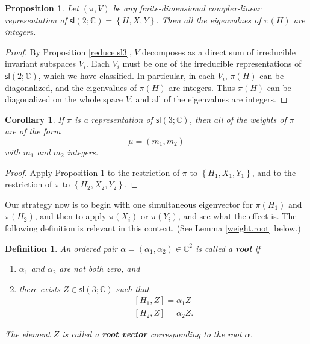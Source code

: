 \documentclass[12pt]{amsbook}
\theoremstyle{plain}
\newtheorem{corollary}[theorem]{Corollary}
\newtheorem{definition}[theorem]{Definition}
\newtheorem{proposition}[theorem]{Proposition}
\numberwithin{equation}{chapter}
\numberwithin{theorem}{chapter}
\begin{document}
\begin{proposition}
\label{sl2.integer}Let $\left(  \pi,V\right)  $ be any finite-dimensional
complex-linear representation of $\mathsf{sl}(2;\mathbb{C})=\left\{
H,X,Y\right\}  $. Then all the eigenvalues of $\pi(H)$ are integers.
\end{proposition}

\begin{proof}
By Proposition \ref{reduce.sl3}, $V$ decomposes as a direct sum of irreducible
invariant subspaces $V_{i}$. Each $V_{i}$ must be one of the irreducible
representations of $\mathsf{sl}(2;\mathbb{C})$, which we have classified. In
particular, in each $V_{i}$, $\pi(H)$ can be diagonalized, and the eigenvalues
of $\pi(H)$ are integers. Thus $\pi(H)$ can be diagonalized on the whole space
$V$, and all of the eigenvalues are integers.
\end{proof}

\begin{corollary}
If $\pi$ is a representation of $\mathsf{sl}\left(  3;\mathbb{C}\right)  $,
then all of the weights of $\pi$ are of the form
\[
\mu=(m_{1},m_{2})
\]
with $m_{1}$ and $m_{2}$ integers.
\end{corollary}

\begin{proof}
Apply Proposition \ref{sl2.integer} to the restriction of $\pi$ to $\left\{
H_{1},X_{1},Y_{1}\right\}  $, and to the restriction of $\pi$ to $\left\{
H_{2},X_{2},Y_{2}\right\}  $.
\end{proof}

Our strategy now is to begin with one simultaneous eigenvector for $\pi(H_{1})
$ and $\pi(H_{2})$, and then to apply $\pi(X_{i})$ or $\pi(Y_{i})$, and see
what the effect is. The following definition is relevant in this context. (See
Lemma \ref{weight.root} below.)

\begin{definition}
An ordered pair $\alpha=\left(  \alpha_{1},\alpha_{2}\right)  \in
\mathbb{C}^{2}$ is called a \textbf{root} if

\begin{enumerate}
\item $\alpha_{1}$ and $\alpha_{2}$ are not both zero, and

\item  there exists $Z\in\mathsf{sl}\left(  3;\mathbb{C}\right)  $ such that
\begin{align*}
\left[  H_{1},Z\right]  =\alpha_{1}Z\\
\left[  H_{2},Z\right]  =\alpha_{2}Z\text{.}%
\end{align*}
\end{enumerate}

The element $Z$ is called a \textbf{root vector} corresponding to the root
$\alpha$.
\end{definition}
\end{document}
